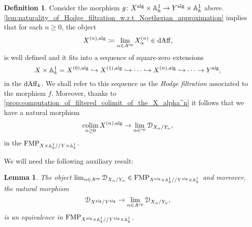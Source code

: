 \documentclass[10pt,a4paper,reqno]{amsart} %
\theoremstyle{plain}
\newtheorem{lem}[thm]{Lemma}
\theoremstyle{definition}
\newtheorem{defin}[thm]{Definition}
\theoremstyle{remark}
\numberwithin{equation}{section}
\begin{document}
\begin{defin}
    Consider the morphism $g \colon X^\mathrm{alg} \times \mathbb A^1_k \to Y^\mathrm{alg} \times \mathbb A^1_k$ above. \cref{lem:naturality_of_Hodge_filtration_w.r.t_Noetherian_approximation}
    implies that for each $n \ge 0$, the object
        \[
            X^{(n), \mathrm{alg}} \coloneqq \lim_{\alpha \in A^\mathrm{op}} X_\alpha^{(n)} \in \mathrm{dAff},  
        \]
    is well defined and it fits into a sequence of square-zero extensions
        \[
            X\times \mathbb A^1_k = X^{(0), \mathrm{alg}} \hookrightarrow X^{(1), \mathrm{alg}}  \hookrightarrow \dots \hookrightarrow X^{(n), \mathrm{alg}} \hookrightarrow \dots \to Y^\mathrm{alg},
        \]
    in the \infcat $\mathrm{dAff}_k$. We shall refer to this sequence as the \emph{Hodge filtration} associated to the morphism $f$. Moreover, thanks to
    \cref{prop:computation_of_filtered_colimit_of_the_X_alpha^n} it follows that we have a natural morphism
        \begin{equation} \label{eq:map_Hodge_filtration_to_deformation}
            \operatorname*{colim}_{n \ge 0} X^{(n), \mathrm{alg}} \to \lim_{\alpha \in ^\mathrm{op}} \mathcal D_{X_\alpha/ Y_\alpha},  
        \end{equation}
    in the \infcat $\mathrm{FMP}_{X \times \mathbb A^1_k/ /Y \times \mathbb A^1_k}$.
\end{defin}

We will need the following auxiliary result:

\begin{lem}
    The object $\lim_{\alpha \in A ^\mathrm{op}} \mathcal D_{X_\alpha / Y_\alpha} \in \mathrm{FMP}_{X^\mathrm{alg} \times \mathbb A^1_k/ /Y^\mathrm{alg} \times \mathbb A^1_k}$ and moreover, the natural morphism
        \[
            \mathcal D_{X^\mathrm{alg}/ Y^\mathrm{alg}} \to \lim_{\alpha \in A ^\mathrm{op}} \mathcal D_{X_\alpha/ Y_\alpha},  
        \]
    is an equivalence in $\mathrm{FMP}_{X^\mathrm{alg} \times \mathbb A^1_k/ /Y^\mathrm{alg} \times \mathbb A^1_k}$.
\end{lem}
\end{document}
